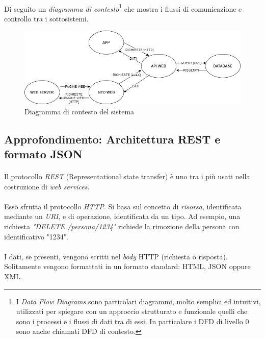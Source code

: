 \documentclass[12pt,a4paper,twoside,english,italian]{book}
\begin{document}
\paragraph{} Di seguito un \emph{diagramma di contesto}\footnote{I \emph{Data Flow Diagrams} sono particolari diagrammi, molto semplici ed intuitivi, utilizzati per spiegare con un approccio strutturato e funzionale quelli che sono i processi e i flussi di dati tra di essi. In particolare i DFD di livello 0 sono anche chiamati DFD di contesto.} \cite{dfd0} che mostra i flussi di comunicazione e controllo tra i sottosistemi.

\begin{figure}[H]
    \centering
    \includegraphics[width=1\textwidth]{img/architettura.png}
    \caption{Diagramma di contesto del sistema}
\end{figure}

\newpage

\subsection{Approfondimento: Architettura REST e formato JSON}

\paragraph{} Il protocollo \emph{REST} \cite{rest} (Representational state transfer) è uno tra i più usati nella costruzione di \emph{web services}. 

\paragraph{} Esso sfrutta il protocollo \emph{HTTP}. Si basa sul concetto di \emph{risorsa}, identificata mediante un \emph{URI}, e di operazione, identificata da un tipo. Ad esempio, una richiesta \emph{"DELETE /persona/1234"} richiede la rimozione della persona con identificativo "1234".

\paragraph{} I dati, se presenti, vengono scritti nel \emph{body} HTTP (richiesta o risposta). Solitamente vengono formattati in un formato standard: HTML, JSON oppure XML. 
\end{document}
